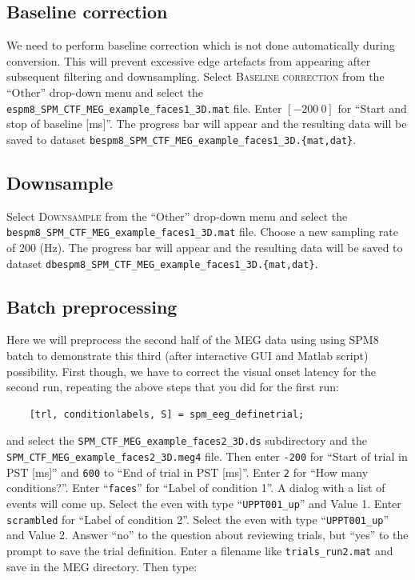 \subsection{Baseline correction}

We need to perform baseline correction which is not done automatically during conversion. This will prevent excessive edge artefacts from appearing after subsequent filtering and downsampling. Select \textsc{Baseline correction} from the ``Other'' drop-down menu and select the \texttt{espm8\_SPM\_CTF\_MEG\_example\_faces1\_3D.mat} file. Enter $[-200\: 0]$ for ``Start and stop of baseline [ms]''. The progress bar will appear and the resulting data will be saved to dataset \texttt{bespm8\_SPM\_\-CTF\_\-MEG\_\-example\_faces1\_3D.\{mat,dat\}}.

\subsection{Downsample}

Select \textsc{Downsample} from the ``Other'' drop-down menu and select the \texttt{bespm8\_SPM\_CTF\_\-MEG\_\-example\_\-faces1\_3D.mat} file. Choose a new sampling rate of 200 (Hz). The progress bar will appear and the resulting data will be saved to dataset \texttt{dbespm8\_SPM\_CTF\_MEG\_example\_faces1\_3D.\{mat,dat\}}.

\subsection{Batch preprocessing}

Here we will preprocess the second half of the MEG data using using SPM8 batch to demonstrate this third (after interactive GUI and Matlab script) possibility. First though, we have to correct the visual onset latency for the second run, repeating the above steps that you did for the first run:

\begin{verbatim}
    [trl, conditionlabels, S] = spm_eeg_definetrial;
\end{verbatim}

and select the \texttt{SPM\_CTF\_MEG\_example\_faces2\_3D.ds} subdirectory and the \texttt{SPM\_\-CTF\_\-MEG\_\-example\_\-faces2\_3D.meg4} file. Then enter \texttt{-200} for ``Start of trial in PST [ms]'' and \texttt{600} to ``End of trial in PST [ms]''. Enter \texttt{2} for ``How many conditions?''. Enter ``\texttt{faces}'' for ``Label of condition 1''. A dialog with a list of events will come up. Select the even with type ``\texttt{UPPT001\_up}'' and Value 1. Enter \texttt{scrambled} for ``Label of condition 2''. Select the even with type ``\texttt{UPPT001\_up}'' and Value 2. Answer ``no'' to the question about reviewing trials, but ``yes'' to the prompt to save the trial definition. Enter a filename like \texttt{trials\_run2.mat} and save in the MEG directory. Then type:


